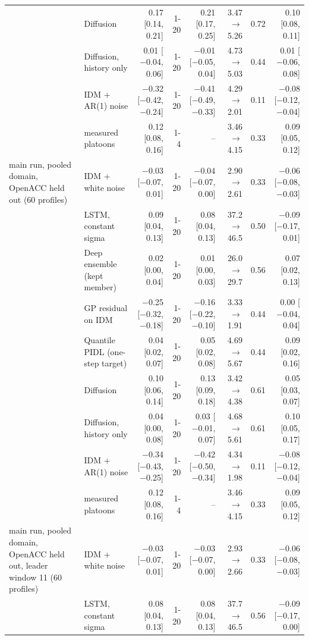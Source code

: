 \begin{longtable}{llrrrrrr}
 & Diffusion & 0.17 [0.14, 0.21] & 1-20 & 0.21 [0.17, 0.25] & 3.47 $\rightarrow$ 5.26 & 0.72 & 0.10 [0.08, 0.11] \\
 & Diffusion, history only & 0.01 [$-$0.04, 0.06] & 1-20 & $-$0.01 [$-$0.05, 0.04] & 4.73 $\rightarrow$ 5.03 & 0.44 & 0.01 [$-$0.06, 0.08] \\
 & IDM + AR(1) noise & $-$0.32 [$-$0.42, $-$0.24] & 1-20 & $-$0.41 [$-$0.49, $-$0.33] & 4.29 $\rightarrow$ 2.01 & 0.11 & $-$0.08 [$-$0.12, $-$0.04] \\
 & measured platoons & 0.12 [0.08, 0.16] & 1-4 & -- & 3.46 $\rightarrow$ 4.15 & 0.33 & 0.09 [0.05, 0.12] \\
\midrule
main run, pooled domain, OpenACC held out (60 profiles) & IDM + white noise & $-$0.03 [$-$0.07, 0.01] & 1-20 & $-$0.04 [$-$0.07, 0.00] & 2.90 $\rightarrow$ 2.61 & 0.33 & $-$0.06 [$-$0.08, $-$0.03] \\
 & LSTM, constant sigma & 0.09 [0.04, 0.13] & 1-20 & 0.08 [0.04, 0.13] & 37.2 $\rightarrow$ 46.5 & 0.50 & $-$0.09 [$-$0.17, 0.01] \\
 & Deep ensemble (kept member) & 0.02 [0.00, 0.04] & 1-20 & 0.01 [0.00, 0.03] & 26.0 $\rightarrow$ 29.7 & 0.56 & 0.07 [0.02, 0.13] \\
 & GP residual on IDM & $-$0.25 [$-$0.32, $-$0.18] & 1-20 & $-$0.16 [$-$0.22, $-$0.10] & 3.33 $\rightarrow$ 1.91 & 0.44 & 0.00 [$-$0.04, 0.04] \\
 & Quantile PIDL (one-step target) & 0.04 [0.02, 0.07] & 1-20 & 0.05 [0.02, 0.08] & 4.69 $\rightarrow$ 5.67 & 0.44 & 0.09 [0.02, 0.16] \\
 & Diffusion & 0.10 [0.06, 0.14] & 1-20 & 0.13 [0.09, 0.18] & 3.42 $\rightarrow$ 4.38 & 0.61 & 0.05 [0.03, 0.07] \\
 & Diffusion, history only & 0.04 [0.00, 0.08] & 1-20 & 0.03 [$-$0.01, 0.07] & 4.68 $\rightarrow$ 5.61 & 0.61 & 0.10 [0.05, 0.17] \\
 & IDM + AR(1) noise & $-$0.34 [$-$0.43, $-$0.25] & 1-20 & $-$0.42 [$-$0.50, $-$0.34] & 4.34 $\rightarrow$ 1.98 & 0.11 & $-$0.08 [$-$0.12, $-$0.04] \\
 & measured platoons & 0.12 [0.08, 0.16] & 1-4 & -- & 3.46 $\rightarrow$ 4.15 & 0.33 & 0.09 [0.05, 0.12] \\
\midrule
main run, pooled domain, OpenACC held out, leader window 11 (60 profiles) & IDM + white noise & $-$0.03 [$-$0.07, 0.01] & 1-20 & $-$0.03 [$-$0.07, 0.00] & 2.93 $\rightarrow$ 2.66 & 0.33 & $-$0.06 [$-$0.08, $-$0.03] \\
 & LSTM, constant sigma & 0.08 [0.04, 0.13] & 1-20 & 0.08 [0.04, 0.13] & 37.7 $\rightarrow$ 46.5 & 0.56 & $-$0.09 [$-$0.17, 0.00] \\

\end{longtable}
